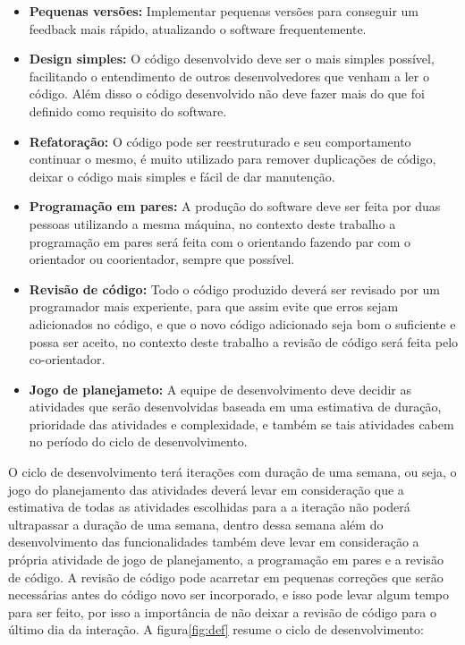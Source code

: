 \begin{itemize}
  \item \textbf{Pequenas versões:} Implementar pequenas versões para conseguir
  um feedback mais rápido, atualizando o software frequentemente.
  \item \textbf{Design simples:} O código desenvolvido deve ser o mais simples possível,
  facilitando o entendimento de outros desenvolvedores que venham a ler o código.
  Além disso o código desenvolvido não deve fazer mais do que foi definido como
  requisito do software.
  \item \textbf{Refatoração:} O código pode ser reestruturado e seu comportamento
  continuar o mesmo, é muito utilizado para remover duplicações de código, deixar
  o código mais simples e fácil de dar manutenção.
  \item \textbf{Programação em pares:} A produção do software deve ser feita por duas
  pessoas utilizando a mesma máquina, no contexto deste trabalho a programação
  em pares será feita com o orientando fazendo par com o orientador ou coorientador,
  sempre que possível.
  \item \textbf{Revisão de código:} Todo o código produzido deverá ser revisado
  por um programador mais experiente, para que assim evite que erros sejam
  adicionados no código, e que o novo código adicionado seja bom o suficiente
  e possa ser aceito, no contexto deste trabalho a revisão de código será
  feita pelo co-orientador.
  \item \textbf{Jogo de planejameto:} A equipe de desenvolvimento deve decidir
  as atividades que serão desenvolvidas baseada em uma estimativa de duração,
  prioridade das atividades e complexidade, e também se tais atividades cabem
  no período do ciclo de desenvolvimento.
\end{itemize}

O ciclo de desenvolvimento terá iterações com duração de uma semana, ou seja,
o jogo do planejamento das atividades deverá levar em consideração que a
estimativa de todas as atividades escolhidas para a a iteração não poderá
ultrapassar a duração de uma semana, dentro dessa semana além do desenvolvimento
das funcionalidades também deve levar em consideração a própria atividade de jogo
de planejamento, a programação em pares e a revisão de código. A revisão de código
pode acarretar em pequenas correções que serão necessárias antes do código novo
ser incorporado, e isso pode levar algum tempo para ser feito, por isso a importância
de não deixar a revisão de código para o último dia da interação. A figura\ref{fig:def}
resume o ciclo de desenvolvimento:

